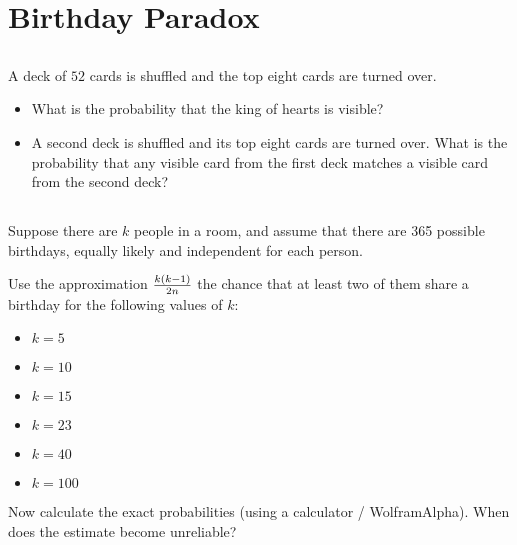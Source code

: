 \documentclass[12pt]{article}
\begin{document}
 

\section{Birthday Paradox}

\subsection{}


A deck of $52$ cards is shuffled and the top eight cards are turned over.

\begin{itemize}
\item What is the probability that the king of hearts is visible?
\item A second deck is shuffled and its top eight cards are turned over. What is the
probability that any visible card from the first deck matches a visible card from the second deck? 
\end{itemize}



\subsection{}

Suppose there are $k$ people in a room, and assume that there are 365 possible birthdays, equally likely and independent for each person.

Use the approximation ${k(k-1) \over 2n}$ the chance that at least two of them share a birthday for the following values of $k$:

\begin{itemize}
\item $k=5$
\item $k=10$
\item $k=15$
\item $k=23$
\item $k=40$
\item $k=100$
\end{itemize}

Now calculate the exact probabilities (using a calculator / WolframAlpha). When does the estimate become unreliable?

\end{document}
